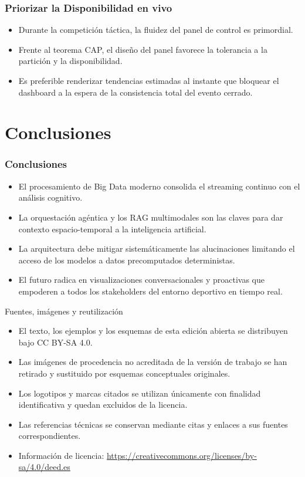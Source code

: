 \documentclass[aspectratio=169]{beamer}
\begin{document}
\begin{frame}\frametitle{Priorizar la Disponibilidad en vivo}
\begin{itemize}
    \item Durante la competición táctica, la fluidez del panel de control es primordial.
    \item Frente al teorema CAP, el diseño del panel favorece la tolerancia a la partición y la disponibilidad.
    \item Es preferible renderizar tendencias estimadas al instante que bloquear el dashboard a la espera de la consistencia total del evento cerrado.
\end{itemize}
\end{frame}

\section{Conclusiones}
\frame{\sectionpage}

\begin{frame}\frametitle{Conclusiones}
\begin{itemize}
    \item El procesamiento de Big Data moderno consolida el streaming continuo con el análisis cognitivo.
    \item La orquestación agéntica y los RAG multimodales son las claves para dar contexto espacio-temporal a la inteligencia artificial.
    \item La arquitectura debe mitigar sistemáticamente las alucinaciones limitando el acceso de los modelos a datos precomputados deterministas.
    \item El futuro radica en visualizaciones conversacionales y proactivas que empoderen a todos los stakeholders del entorno deportivo en tiempo real.
\end{itemize}
\end{frame}



\begin{frame}{Fuentes, imágenes y reutilización}
\small
\begin{itemize}
  \item El texto, los ejemplos y los esquemas de esta edición abierta se distribuyen bajo CC BY-SA 4.0.
  \item Las imágenes de procedencia no acreditada de la versión de trabajo se han retirado y sustituido por esquemas conceptuales originales.
  \item Los logotipos y marcas citados se utilizan únicamente con finalidad identificativa y quedan excluidos de la licencia.
  \item Las referencias técnicas se conservan mediante citas y enlaces a sus fuentes correspondientes.
  \item Información de licencia: \url{https://creativecommons.org/licenses/by-sa/4.0/deed.es}
\end{itemize}
\end{frame}
\end{document}
